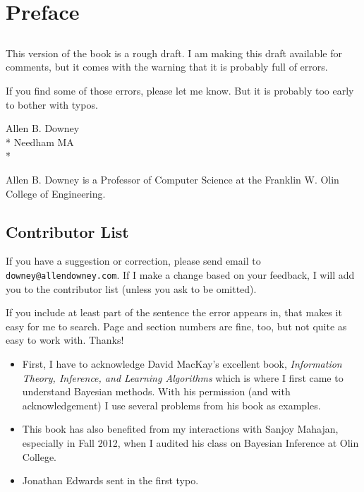 \documentclass[12pt]{book}
\begin{document}
\fi

\chapter{Preface}
\label{preface}

\section*{}

This version of the book is a rough draft.  I am making this draft
available for comments, but it comes with the warning that it is
probably full of errors.

If you find some of those errors, please let me know.  But it is
probably too early to bother with typos.

Allen B. Downey \\*
Needham MA \\*

Allen B. Downey is a Professor of Computer Science at 
the Franklin W. Olin College of Engineering.







\section*{Contributor List}

If you have a suggestion or correction, please send email to 
{\tt downey@allendowney.com}.  If I make a change based on your
feedback, I will add you to the contributor list
(unless you ask to be omitted).

If you include at least part of the sentence the
error appears in, that makes it easy for me to search.  Page and
section numbers are fine, too, but not quite as easy to work with.
Thanks!

\small

\begin{itemize}

\item First, I have to acknowledge David MacKay's excellent book,
  {\it Information Theory, Inference, and Learning Algorithms} which is
  where I first came to understand Bayesian methods.  With his
  permission (and with acknowledgement) I use several problems from
  his book as examples.

\item This book has also benefited from my interactions with Sanjoy
  Mahajan, especially in Fall 2012, when I audited his class on
  Bayesian Inference at Olin College.

\item Jonathan Edwards sent in the first typo.


\end{itemize}
\end{document}
